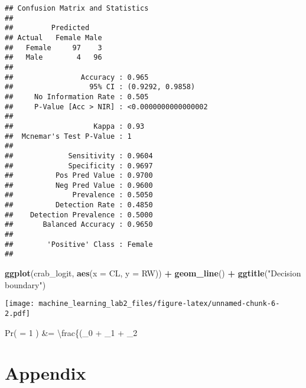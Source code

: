 \documentclass[]{article}
\newenvironment{Shaded}{\begin{snugshade}}{\end{snugshade}}
\newcommand{\KeywordTok}[1]{\textcolor[rgb]{0.13,0.29,0.53}{\textbf{#1}}}
\newcommand{\DataTypeTok}[1]{\textcolor[rgb]{0.13,0.29,0.53}{#1}}
\newcommand{\StringTok}[1]{\textcolor[rgb]{0.31,0.60,0.02}{#1}}
\newcommand{\OperatorTok}[1]{\textcolor[rgb]{0.81,0.36,0.00}{\textbf{#1}}}
\newcommand{\NormalTok}[1]{#1}
\begin{document}
\begin{verbatim}
## Confusion Matrix and Statistics
## 
##         Predicted
## Actual   Female Male
##   Female     97    3
##   Male        4   96
##                                              
##                Accuracy : 0.965              
##                  95% CI : (0.9292, 0.9858)   
##     No Information Rate : 0.505              
##     P-Value [Acc > NIR] : <0.0000000000000002
##                                              
##                   Kappa : 0.93               
##  Mcnemar's Test P-Value : 1                  
##                                              
##             Sensitivity : 0.9604             
##             Specificity : 0.9697             
##          Pos Pred Value : 0.9700             
##          Neg Pred Value : 0.9600             
##              Prevalence : 0.5050             
##          Detection Rate : 0.4850             
##    Detection Prevalence : 0.5000             
##       Balanced Accuracy : 0.9650             
##                                              
##        'Positive' Class : Female             
## 
\end{verbatim}

\begin{Shaded}
\begin{Highlighting}[]
\KeywordTok{ggplot}\NormalTok{(crab_logit, }\KeywordTok{aes}\NormalTok{(}\DataTypeTok{x =}\NormalTok{ CL, }\DataTypeTok{y =}\NormalTok{ RW)) }\OperatorTok{+}\StringTok{ }
\StringTok{  }\KeywordTok{geom_line}\NormalTok{() }\OperatorTok{+}\StringTok{  }
\StringTok{  }\KeywordTok{ggtitle}\NormalTok{(}\StringTok{"Decision boundary"}\NormalTok{)}
\end{Highlighting}
\end{Shaded}

\texttt{[image: machine\_learning\_lab2\_files/figure-latex/unnamed-chunk-6-2.pdf]}

\tiny{Pr}( = 1 \textbar{} ) \&=
\textbackslash{}frac\{(\beta\_0 + \beta\_1  +
\beta\_2

\section{Appendix}\label{appendix}
\end{document}
